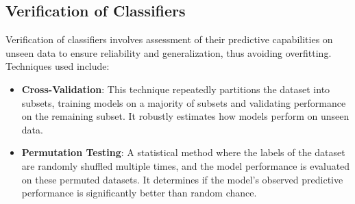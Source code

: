 \documentclass[12pt,a4paper]{report}
\begin{document}
\subsection{Verification of Classifiers}
Verification of classifiers involves assessment of their predictive capabilities on unseen data to ensure reliability and generalization, thus avoiding overfitting. Techniques used include:
\begin{itemize}
\item \textbf{Cross-Validation}: This technique repeatedly partitions the dataset into subsets, training models on a majority of subsets and validating performance on the remaining subset. It robustly estimates how models perform on unseen data.
\item \textbf{Permutation Testing}: A statistical method where the labels of the dataset are randomly shuffled multiple times, and the model performance is evaluated on these permuted datasets. It determines if the model's observed predictive performance is significantly better than random chance.
\end{itemize}
\end{document}
